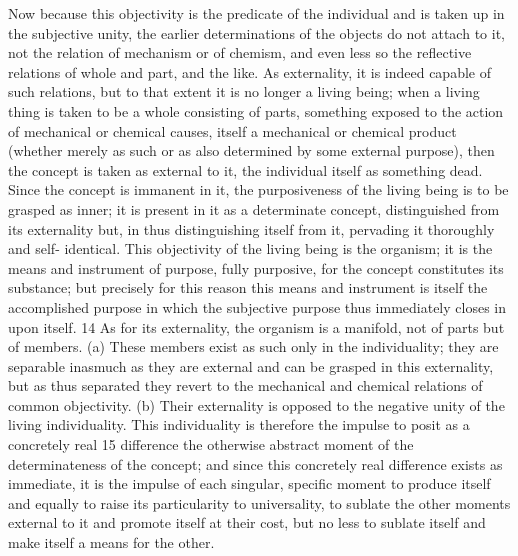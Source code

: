 Now because this objectivity is the predicate of the individual and is
taken up in the subjective unity, the earlier determinations of the objects
do not attach to it, not the relation of mechanism or of chemism, and
even less so the reflective relations of whole and part, and the like. As
externality, it is indeed capable of such relations, but to that extent it is no
longer a living being; when a living thing is taken to be a whole consisting
of parts, something exposed to the action of mechanical or chemical causes,
itself a mechanical or chemical product (whether merely as such or as also
determined by some external purpose), then the concept is taken as external
to it, the individual itself as something dead. Since the concept is immanent
in it, the purposiveness of the living being is to be grasped as inner; it is
present in it as a determinate concept, distinguished from its externality
but, in thus distinguishing itself from it, pervading it thoroughly and self-
identical. This objectivity of the living being is the organism; it is the means
and instrument of purpose, fully purposive, for the concept constitutes
its substance; but precisely for this reason this means and instrument
is itself the accomplished purpose in which the subjective purpose thus
immediately closes in upon itself. 14 As for its externality, the organism is
a manifold, not of parts but of members. (a) These members exist as such
only in the individuality; they are separable inasmuch as they are external
and can be grasped in this externality, but as thus separated they revert to
the mechanical and chemical relations of common objectivity. (b) Their
externality is opposed to the negative unity of the living individuality. This
individuality is therefore the impulse to posit as a concretely real 15 difference
the otherwise abstract moment of the determinateness of the concept; and
since this concretely real difference exists as immediate, it is the impulse
of each singular, specific moment to produce itself and equally to raise its
particularity to universality, to sublate the other moments external to it
and promote itself at their cost, but no less to sublate itself and make itself
a means for the other.

